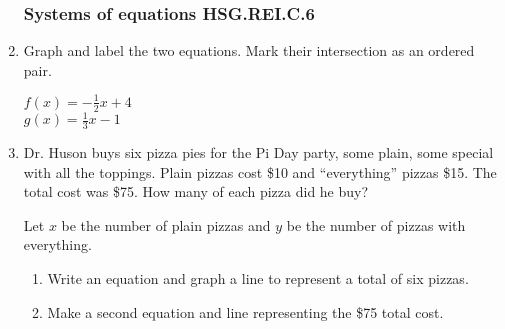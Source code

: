 \begin{enumerate}
\newpage
\subsubsection*{Systems of equations \hfill HSG.REI.C.6}
\item Graph and label the two equations. Mark their intersection as an ordered pair.
  \begin{multicols}{2}
    $f(x) = -\frac{1}{2}x+4$ \\[1cm]
    $g(x) = \frac{1}{3}x-1$ \\
\end{multicols}

  
\item Dr. Huson buys six pizza pies for the Pi Day party, some plain, some special with all the toppings. Plain pizzas cost \$10 and ``everything'' pizzas \$15. The total cost was \$75. How many of each pizza did he buy?
\begin{multicols}{2}
Let $x$ be the number of plain pizzas and $y$ be the number of pizzas with everything.
\begin{enumerate}
  \item Write an equation and graph a line to represent a total of six pizzas.
  \item Make a second equation and line representing the \$75 total cost.
\end{enumerate}
  \begin{flushright}
  \end{flushright}
\end{multicols}


\end{enumerate}
